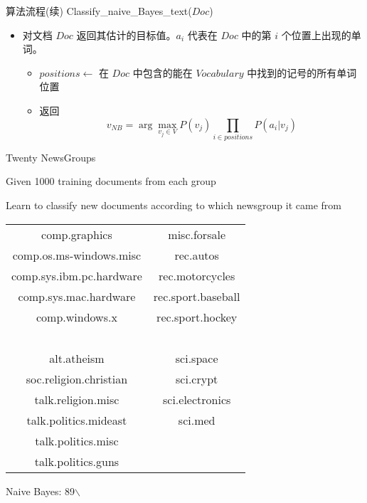 \documentclass[presentation]{beamer}
\begin{document}
\begin{frame}[label={sec:org10c0b22}]{算法流程(续)}
Classify\_naive\_Bayes\_text(\(Doc\))
\begin{itemize}
\item 对文档 \(Doc\) 返回其估计的目标值。\(a_i\) 代表在 \(Doc\) 中的第 \(i\) 个位置上出现的单词。
\begin{itemize}
\item \(positions \leftarrow\) 在 \(Doc\) 中包含的能在 \(Vocabulary\) 中找到的记号的所有单词位置
\item 返回
$$v_{NB} = \arg\max_{v_{j} \in V} P(v_{j}) \prod_{i \in positions}P(a_{i}|v_{j})$$
\end{itemize}
\end{itemize}
\end{frame}

\begin{frame}[label={sec:org4a3db45}]{Twenty NewsGroups}
\small

Given 1000 training documents from each group

Learn to classify new documents according to which newsgroup it came from

\bigskip
\begin{center}
\begin{tabular}{cc}
comp.graphics & misc.forsale\\
comp.os.ms-windows.misc & rec.autos \\
comp.sys.ibm.pc.hardware & rec.motorcycles \\
comp.sys.mac.hardware & rec.sport.baseball \\
comp.windows.x & rec.sport.hockey \\
\ & \ \\
alt.atheism & sci.space \\
soc.religion.christian  & sci.crypt\\
talk.religion.misc & sci.electronics\\
talk.politics.mideast & sci.med \\
talk.politics.misc & \ \\
talk.politics.guns & \ \\
\end{tabular}
\end{center}


Naive Bayes: 89$\backslash$%
\end{frame}
\end{document}
